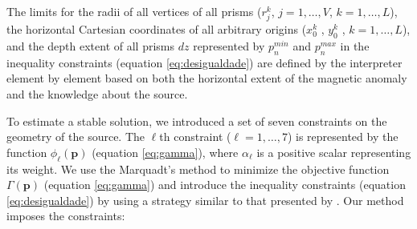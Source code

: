 The limits for the radii of all vertices of all prisms ($r^k_j$, $j=1,\dots , V$, $k=1,\dots ,L$), the horizontal Cartesian coordinates of all
arbitrary origins ($x_0^k$ , $y_0^k$ , $k = 1, \dots, L$), and the depth extent of all prisms $dz$ represented by $p_{n }^{min}$ and $p_n^{max}$ in the inequality constraints (equation \ref{eq:desigualdade}) are defined by the interpreter element by element based on both the horizontal extent of the magnetic anomaly and the knowledge about the source. 

To estimate a stable solution, we introduced a set of seven constraints on the geometry of the source. The $\ell$th constraint ($\ell = 1, \dots , 7$) is represented by the function $\phi_{\ell} (\mathbf{p})$ (equation \ref{eq:gamma}), where $\alpha_{\ell}$ is a positive scalar representing its weight. We use the Marquadt's method to minimize the objective function $\Gamma (\mathbf{p})$ (equation \ref{eq:gamma}) and introduce the inequality constraints (equation \ref{eq:desigualdade}) by using a strategy similar to that presented by \citet{barbosa-etal1999}. Our method imposes the constraints:
